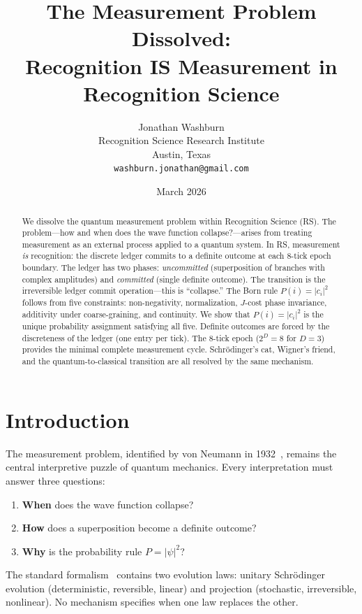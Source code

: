 \documentclass[12pt,a4paper]{article}
\title{The Measurement Problem Dissolved:\\
Recognition IS Measurement in Recognition Science}
\author{Jonathan Washburn\\
Recognition Science Research Institute\\
Austin, Texas\\
\texttt{washburn.jonathan@gmail.com}}
\date{March 2026}
\theoremstyle{definition}
\theoremstyle{remark}
\begin{document}
\maketitle

\begin{abstract}
We dissolve the quantum measurement problem within Recognition
Science (RS).  The problem---how and when does the wave function
collapse?---arises from treating measurement as an external process
applied to a quantum system.  In RS, measurement \emph{is}
recognition: the discrete ledger commits to a definite outcome at
each 8-tick epoch boundary.  The ledger has two phases:
\emph{uncommitted} (superposition of branches with complex
amplitudes) and \emph{committed} (single definite outcome).  The
transition is the irreversible ledger commit operation---this is
``collapse.''  The Born rule $P(i) = |c_i|^2$ follows from five
constraints: non-negativity, normalization, $J$-cost phase
invariance, additivity under coarse-graining, and continuity.
We show that $P(i) = |c_i|^2$ is the unique
probability assignment satisfying all five.  Definite outcomes are
forced by the discreteness of the ledger (one entry per tick).
The 8-tick epoch ($2^D = 8$ for $D = 3$) provides the minimal
complete measurement cycle.  Schr\"odinger's cat,
Wigner's friend, and the quantum-to-classical transition are all
resolved by the same mechanism.
\end{abstract}

\section{Introduction}
\label{sec:intro}

The measurement problem, identified by von Neumann in
1932~\cite{vN}, remains the central interpretive puzzle of quantum
mechanics.  Every interpretation must answer three questions:
\begin{enumerate}[nosep]
  \item \textbf{When} does the wave function collapse?
  \item \textbf{How} does a superposition become a definite
  outcome?
  \item \textbf{Why} is the probability rule $P = |\psi|^2$?
\end{enumerate}

The standard formalism~\cite{Bell} contains two evolution laws:
unitary Schr\"odinger evolution (deterministic, reversible, linear)
and projection (stochastic, irreversible, nonlinear).  No mechanism
specifies when one law replaces the other.
\end{document}
